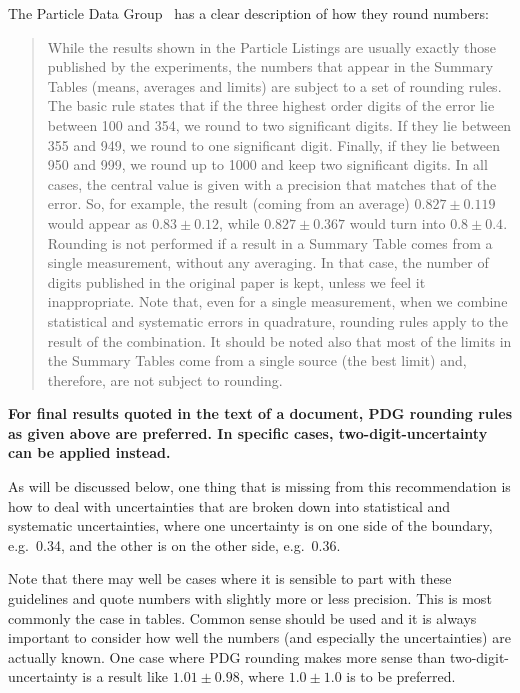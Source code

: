 \documentclass[UKenglish]{latex/atlasdoc}
\begin{document}
The Particle Data Group~\cite{PDG2012} has a clear description of how
they round numbers:
\begin{quotation}
  While the results shown in the Particle Listings are usually exactly
  those published by the experiments, the numbers that appear in the
  Summary Tables (means, averages and limits) are subject to a set of
  rounding rules. The basic rule states that if the three highest
  order digits of the error lie between 100 and 354, we round to two
  significant digits. If they lie between 355 and 949, we round to one
  significant digit. Finally, if they lie between 950 and 999, we
  round up to 1000 and keep two significant digits. In all cases, the
  central value is given with a precision that matches that of the
  error. So, for example, the result (coming from an average) $0.827
  \pm 0.119$ would appear as $0.83 \pm 0.12$, while $0.827 \pm 0.367$
  would turn into $0.8 \pm 0.4$. Rounding is not performed if a result in a
  Summary Table comes from a single measurement, without any
  averaging. In that case, the number of digits published in the
  original paper is kept, unless we feel it inappropriate. Note that,
  even for a single measurement, when we combine statistical and
  systematic errors in quadrature, rounding rules apply to the result
  of the combination. It should be noted also that most of the limits
  in the Summary Tables come from a single source (the best limit)
  and, therefore, are not subject to rounding.
\end{quotation}

\textbf{For final results quoted in the text of a document, PDG
  rounding rules as given above are preferred.  In specific cases,
  two-digit-uncertainty can be applied instead.}

As will be discussed below, one thing that is missing from this
recommendation is how to deal with uncertainties that are broken down into
statistical and systematic uncertainties, where one uncertainty is on one
side of the boundary, e.g.\ \num{0.34}, and the other is on the other
side, e.g.\ \num{0.36}.

Note that there may well be cases where it is sensible to part with
these guidelines and quote numbers with slightly more or less
precision. This is most commonly the case in tables. Common
sense should be used and it is always important to consider how
well the numbers (and especially the uncertainties) are actually known.
One case where PDG rounding makes more sense than
two-digit-uncertainty is a result like $1.01 \pm 0.98$, where $1.0 \pm 1.0$
is to be preferred.
\end{document}
